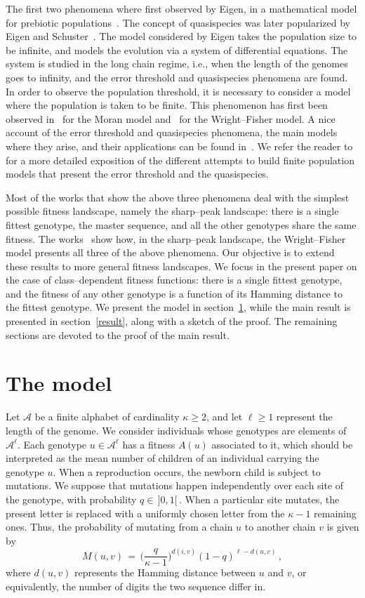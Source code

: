 \documentclass[a4paper,12pt]{article}
\theoremstyle{definition}
\theoremstyle{remark}
\def \cA {\mathcal{A}}
\def \k {\kappa}
\begin{document}
The first two phenomena where first observed by Eigen, 
in a mathematical model for prebiotic populations~\cite{Eigen1}.
The concept of quasispecies was later popularized by Eigen and Schuster~\cite{ES1}.
The model considered by Eigen takes the population size to be infinite,
and models the evolution via a system of differential equations.
The system is studied in the long chain regime, i.e., when 
the length of the genomes goes to infinity, 
and the error threshold and quasispecies phenomena are found. 
In order to observe the population threshold,
it is necessary to consider a model where the population is taken to be finite.
This phenomenon has first been observed in~\cite{CerfM} for the Moran model
and~\cite{CerfWF} for the Wright--Fisher model.
A nice account of the error threshold 
and quasispecies phenomena, the main models where they arise, and their applications
can be found in~\cite{doschu}.
We refer the reader to~\cite{CerfM} for a more detailed exposition
of the different attempts to build finite population models that
present the error threshold and the quasispecies.


Most of the works that show the above three phenomena deal with the simplest possible 
fitness landscape, namely the sharp--peak landscape: there is a single fittest genotype,
the master sequence, and all the other genotypes share the same fitness.
The works~\cite{CerfWF,DWF} show how, in the sharp--peak landscape,
the Wright--Fisher model presents all three of the above phenomena.
Our objective is to extend these results to more general fitness landscapes.
We focus in the present paper on the case of class--dependent fitness functions:
there is a single fittest genotype,
and the fitness of any other genotype is a function of its Hamming distance
to the fittest genotype.
We present the model in section~\ref{model},
while the main result is presented in section~\ref{result},
along with a sketch of the proof.
The remaining sections are devoted to the proof of the main result.

\section{The model}\label{model}
Let $\cA$ be a finite alphabet of cardinality $\k\geq2$,
and let $\ell\geq 1$ represent the length of the genome.
We consider individuals whose genotypes are elements of $\cA^\ell$.
Each genotype $u\in\cA^\ell$ has a fitness $A(u)$
associated to it,
which should be interpreted as
the mean number of children of an individual carrying the genotype $u$.
When a reproduction occurs,
the newborn child is subject to mutations.
We suppose that mutations happen independently 
over each site of the genotype,
with probability $q\in\,]0,1[\,$.
When a particular site mutates, 
the present letter is replaced with 
a uniformly chosen letter from the $\k-1$ remaining ones.
Thus, the probability of mutating from a chain $u$
to another chain $v$ is given by
$$M(u,v)\,=\,\Big(
\frac{q}{\k-1}
\Big)^{d(i,v)}(1-q)^{\ell-d(u,v)}\,,$$
where $d(u,v)$ represents the Hamming distance between $u$ and $v$,
or equivalently, the number of digits the two sequence differ in.
\end{document}
